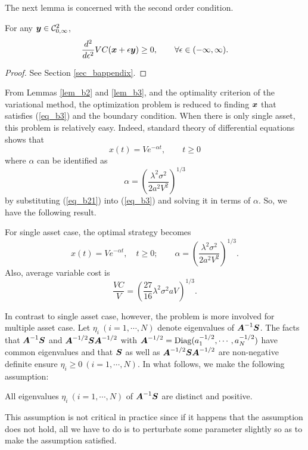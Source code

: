 \noindent The next lemma is concerned with the second order condition.
\begin{lemma}\label{lem_b3}
 \quad For any $\y \in \calC_{0,\infty}^2$,
\[ %
  \ddif{}{\epsilon} VC(\x+\epsilon \y) \geq 0, \qquad \forall \epsilon \in (-\infty,\infty).
\] %
\end{lemma}

\begin{proof}
  See Section \ref{sec_bappendix}.
\end{proof}


 From Lemmas \ref{lem_b2} and \ref{lem_b3}, and the optimality criterion of the variational method, the optimization problem is reduced to finding $\x$ that satisfies (\ref{eq_b3}) and the boundary condition.  When there is only single asset, this problem is relatively easy.  Indeed, standard theory of differential equations shows that
\begin{equation}\label{eq_b21}
  x(t) = V e^{-\alpha t}, \qquad t \geq 0
\end{equation}
where $\alpha$ can be identified as
\[
  \alpha = \left( \frac{\lambda^2 \sigma^2}{2a^2V^2} \right)^{1/3}
\]
by substituting (\ref{eq_b21}) into (\ref{eq_b3}) and solving it in
terms of $\alpha$.
  So, we have the following result.

\begin{proposition}\label{cor_b1}
 \quad For single asset case, the optimal strategy becomes
\[ %
  x(t) = V e^{-\alpha t}, \quad t \geq 0; \qquad
  \alpha = \left( \frac{\lambda^2 \sigma^2}{2a^2V^2} \right)^{1/3}.
\] %
 Also, average variable cost is
\[ %
  \frac{VC}{V} = \left( \frac{27}{16}\lambda^2\sigma^2 a V \right)^{1/3}.
\] %
\end{proposition}
  
 In contrast to single asset case, however, the problem is more involved for multiple asset case.  Let $\eta_i\ (i=1,\cdots,N)$ denote eigenvalues of $\keymtx$.  The facts that $\keymtx$ and $\A^{-1/2}\S\A^{-1/2}$ with $\A^{-1/2}=\mbox{Diag}(a_1^{-1/2},\cdots,a_N^{-1/2})$ have common eigenvalues and that $\S$ as well as $\A^{-1/2}\S\A^{-1/2}$ are non-negative definite ensure $\eta_i\geq 0\ (i=1,\cdots,N)$.  In what follows, we make the following assumption:
\begin{assumption}\label{ass_b1}
 \quad All eigenvalues $\eta_i\ (i=1,\cdots,N)$ of $\keymtx$ are distinct and positive.
\end{assumption}
 This assumption is not critical in practice since if it happens that the assumption does not hold, all we have to do is to perturbate some parameter slightly so as to make the assumption satisfied.

